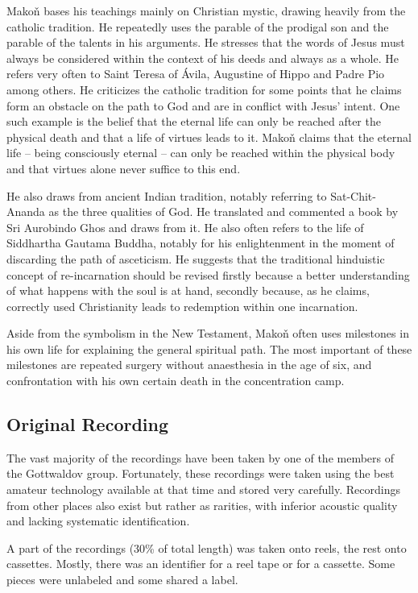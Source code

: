 \documentclass{llncs}
\begin{document}
Makoň bases his teachings mainly on Christian mystic, drawing
heavily from the catholic tradition. He repeatedly uses the parable of the
prodigal son and the parable of the talents in his arguments. He stresses that
the words of Jesus must always be considered within the context of his deeds and
always as a whole. He refers very often to Saint Teresa of
Ávila, Augustine of Hippo and Padre Pio among others. He criticizes the catholic
tradition for some points that he claims form an obstacle on the path to God and
are in conflict with Jesus' intent. One such example is the belief that the
eternal life can only be reached after the physical death and that a life of
virtues leads to it. Makoň claims that the eternal life -- being consciously
eternal -- can only be reached within the physical body and that virtues alone
never suffice to this end.

He also draws from ancient Indian tradition, notably referring to
Sat-Chit-Ananda as the three qualities of God. He translated and commented a
book by Sri Aurobindo Ghos and draws from it. He also often refers to the life
of Siddhartha Gautama Buddha, notably for his enlightenment in the moment of
discarding the path of asceticism. He suggests that the traditional hinduistic
concept of re-incarnation should be revised firstly because a better
understanding of what happens with the soul is at hand, secondly because, as he
claims, correctly used Christianity leads to redemption within one incarnation.

Aside from the symbolism in the New Testament, Makoň often uses milestones in
his own life for explaining the general spiritual path. The most important of
these milestones are repeated surgery without anaesthesia in the age of six, and
confrontation with his own certain death in the concentration camp.

\subsection{Original Recording}

The vast majority of the recordings have been taken by one of the members
of the Gottwaldov group. Fortunately, these recordings were taken using the best
amateur technology available at that time and stored very carefully. Recordings
from other places also exist but rather as rarities, with inferior acoustic
quality and lacking systematic identification.

A part of the recordings (30\% of total length) was taken onto reels, the rest onto cassettes. Mostly, there was an identifier for a reel tape or for a cassette. Some pieces were unlabeled and some shared a label. 
\end{document}
